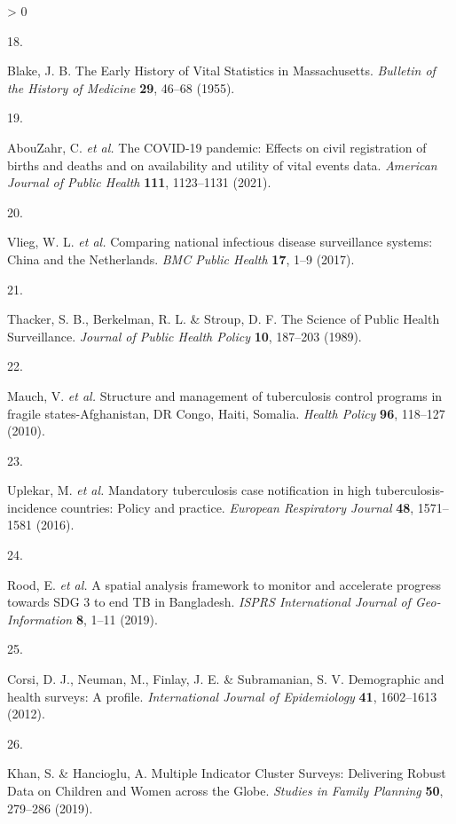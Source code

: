 \documentclass[
]{article}
\newlength{\cslhangindent}
\newlength{\csllabelwidth}
\newenvironment{CSLReferences}[2] %
 {%
  \setlength{\parindent}{0pt}
  \ifodd #1 \everypar{\setlength{\hangindent}{\cslhangindent}}\ignorespaces\fi
  \ifnum #2 > 0
  \setlength{\parskip}{#2\baselineskip}
  \fi
 }%
 {}
\newcommand{\CSLLeftMargin}[1]{\parbox[t]{\csllabelwidth}{#1}}
\newcommand{\CSLRightInline}[1]{\parbox[t]{\linewidth - \csllabelwidth}{#1}\break}
\begin{document}
\begin{CSLReferences}{0}{0}
\leavevmode\hypertarget{ref-Blake1955}{}%
\CSLLeftMargin{18. }
\CSLRightInline{Blake, J. B. {The Early History of Vital Statistics in Massachusetts}. \emph{Bulletin of the History of Medicine} \textbf{29}, 46--68 (1955).}

\leavevmode\hypertarget{ref-AbouZahr2021}{}%
\CSLLeftMargin{19. }
\CSLRightInline{AbouZahr, C. \emph{et al.} {The COVID-19 pandemic: Effects on civil registration of births and deaths and on availability and utility of vital events data}. \emph{American Journal of Public Health} \textbf{111}, 1123--1131 (2021).}

\leavevmode\hypertarget{ref-Vlieg2017}{}%
\CSLLeftMargin{20. }
\CSLRightInline{Vlieg, W. L. \emph{et al.} {Comparing national infectious disease surveillance systems: China and the Netherlands}. \emph{BMC Public Health} \textbf{17}, 1--9 (2017).}

\leavevmode\hypertarget{ref-Thacker1989}{}%
\CSLLeftMargin{21. }
\CSLRightInline{Thacker, S. B., Berkelman, R. L. \& Stroup, D. F. {The Science of Public Health Surveillance}. \emph{Journal of Public Health Policy} \textbf{10}, 187--203 (1989).}

\leavevmode\hypertarget{ref-Mauch2010}{}%
\CSLLeftMargin{22. }
\CSLRightInline{Mauch, V. \emph{et al.} {Structure and management of tuberculosis control programs in fragile states-Afghanistan, DR Congo, Haiti, Somalia}. \emph{Health Policy} \textbf{96}, 118--127 (2010).}

\leavevmode\hypertarget{ref-Uplekar2016}{}%
\CSLLeftMargin{23. }
\CSLRightInline{Uplekar, M. \emph{et al.} {Mandatory tuberculosis case notification in high tuberculosis-incidence countries: Policy and practice}. \emph{European Respiratory Journal} \textbf{48}, 1571--1581 (2016).}

\leavevmode\hypertarget{ref-Rood2019}{}%
\CSLLeftMargin{24. }
\CSLRightInline{Rood, E. \emph{et al.} {A spatial analysis framework to monitor and accelerate progress towards SDG 3 to end TB in Bangladesh}. \emph{ISPRS International Journal of Geo-Information} \textbf{8}, 1--11 (2019).}

\leavevmode\hypertarget{ref-Corsi2012}{}%
\CSLLeftMargin{25. }
\CSLRightInline{Corsi, D. J., Neuman, M., Finlay, J. E. \& Subramanian, S. V. {Demographic and health surveys: A profile}. \emph{International Journal of Epidemiology} \textbf{41}, 1602--1613 (2012).}

\leavevmode\hypertarget{ref-Khan2019}{}%
\CSLLeftMargin{26. }
\CSLRightInline{Khan, S. \& Hancioglu, A. {Multiple Indicator Cluster Surveys: Delivering Robust Data on Children and Women across the Globe}. \emph{Studies in Family Planning} \textbf{50}, 279--286 (2019).}


\end{CSLReferences}
\end{document}

